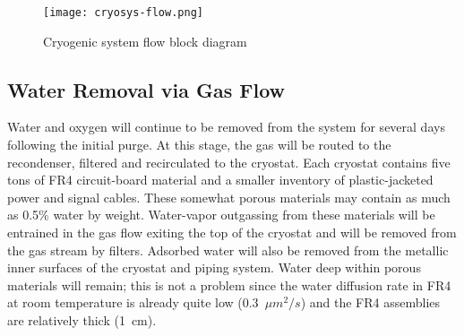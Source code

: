 \begin{figure}[htbp]
\centering
\texttt{[image: cryosys-flow.png]} 
\caption{Cryogenic system flow block diagram}
\label{fig:v5ch2-LBNF-cryo-process-2014}
\end{figure}



\subsection{Water Removal via Gas Flow}

Water and oxygen will continue to be removed from the system for several days following the
initial purge. At this stage, the gas will be routed to the recondenser, filtered and
recirculated to the cryostat. Each cryostat contains five tons of FR4
circuit-board material and a
smaller inventory of plastic-jacketed power and signal cables. These somewhat porous
materials may contain as much as 0.5\% water by weight. Water-vapor outgassing from these
materials will be entrained in the gas flow exiting
the top of the cryostat and will be removed
from the gas stream by filters. Adsorbed water will also be removed from the metallic inner
surfaces of the cryostat and piping system. Water deep within porous materials will remain;
this is not a problem since
the water diffusion rate in FR4 at room temperature is already 
quite low (0.3~$\mu m^2 /s$) and the FR4 assemblies are relatively thick (1~cm).



